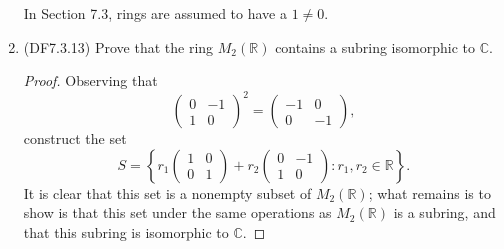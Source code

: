 \documentclass[11pt]{article}
\newcommand{\cbr}[1]{\left\{#1\right\}}
\begin{document}
\begin{enumerate}
    In Section 7.3, rings are assumed to have a $1\neq 0$.
    \item (DF7.3.13) Prove that the ring $M_2(\mathbb{R})$ contains a subring isomorphic to $\mathbb{C}$.
    \begin{proof}
        Observing that \[\begin{pmatrix}
            0 & -1 \\ 1 & 0 
        \end{pmatrix}^2 = \begin{pmatrix}
            -1 & 0 \\ 0 & -1
        \end{pmatrix},\] construct the set \[S = \cbr{r_1\begin{pmatrix}
            1 & 0 \\ 0 & 1
        \end{pmatrix} + r_2\begin{pmatrix}
            0 & -1 \\ 1 & 0 
        \end{pmatrix}\colon r_1,r_2\in\mathbb{R}}.\] It is clear that this set is a nonempty subset of $M_2(\mathbb{R})$; what remains is to show is that this set under the same operations as $M_2(\mathbb{R})$ is a subring, and that this subring is isomorphic to $\mathbb{C}$.


\end{proof}
\end{enumerate}
\end{document}
